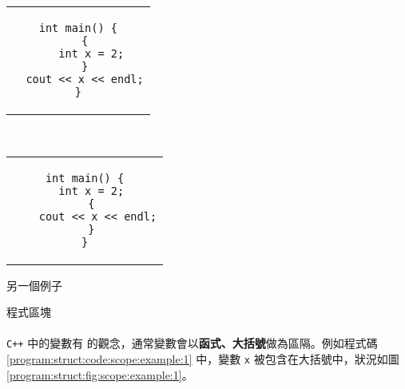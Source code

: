 \documentclass[12pt,a4paper,oneside]{article}
\begin{document}
\begin{CJK}{UTF8}{bkai}
\begin{code}[h!]
\centering
\begin{subcode}{.43\textwidth}
  \centering
  \begin{tabular}{c}
  \begin{lstlisting}
int main() {
  {
    int x = 2;
  }
  cout << x << endl;
}
  \end{lstlisting}
  \end{tabular}
  \caption{被大括號包住的 \lstinline!x!}
  \label{program:struct:code:scope:example:1}
\end{subcode}
~
\begin{subcode}{.43\textwidth}
  \centering
  \begin{tabular}{c}
  \begin{lstlisting}
int main() {
  int x = 2;
  {
    cout << x << endl;
  }
}
  \end{lstlisting}
  \end{tabular}
  \caption{另一個例子}
  \label{program:struct:code:scope:example:2}
\end{subcode}
\caption{程式區塊}
\label{program:struct:code:scope:example}
\end{code}

\paragraph{}\texttt{C++} 中的變數有 的觀念，通常變數會以{\color{blue}\textbf{函式、大括號}}做為區隔。例如程式碼 \ref{program:struct:code:scope:example:1} 中，變數 \lstinline!x! 被包含在大括號中，狀況如圖 \ref{program:struct:fig:scope:example:1}。


\end{CJK}
\end{document}

